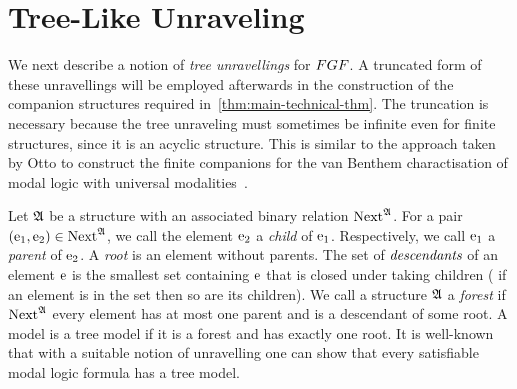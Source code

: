
\section{Tree-Like Unraveling}\label{sec:unraveling}
We next describe a notion of \emph{tree unravellings} for $\FGF$.
A truncated form of these unravellings will be employed afterwards in the construction of the companion structures required in~\cref{thm:main-technical-thm}.
The truncation is necessary because the tree unraveling must sometimes be infinite even for finite structures, since it is an acyclic structure.
This is similar to the approach taken by Otto to construct the finite companions for the van Benthem charactisation of modal logic with universal modalities~\cite[Proof of Lemma 38]{Otto04}.

Let ${\mathfrak{A}}$ be a structure with an associated binary relation $\mathrm{Next}^{{\mathfrak{A}}}$.
For a pair $(\mathrm{e}_1, \mathrm{e}_2) \in \mathrm{Next}^{{\mathfrak{A}}}$, we call the element $\mathrm{e}_2$ a \emph{child} of $\mathrm{e}_1$. Respectively, we call $\mathrm{e}_1$ a \emph{parent} of $\mathrm{e}_2$.
A \emph{root} is an element without parents.
The set of $\emph{descendants}$ of an element $\mathrm{e}$ is the smallest set containing $\mathrm{e}$ that is closed under taking children (\ie{} if an element is in the set then so are its children).
We call a structure ${\mathfrak{A}}$ a \emph{forest} if $\mathrm{Next}^{{\mathfrak{A}}}$ every element has at most one parent and is a descendant of some root.
A model is a tree model if it is a forest and has exactly one root.
It is well-known that with a suitable notion of unravelling\cite[Prop. 3]{Rosen97} one can show that every satisfiable modal logic formula has a tree model.

